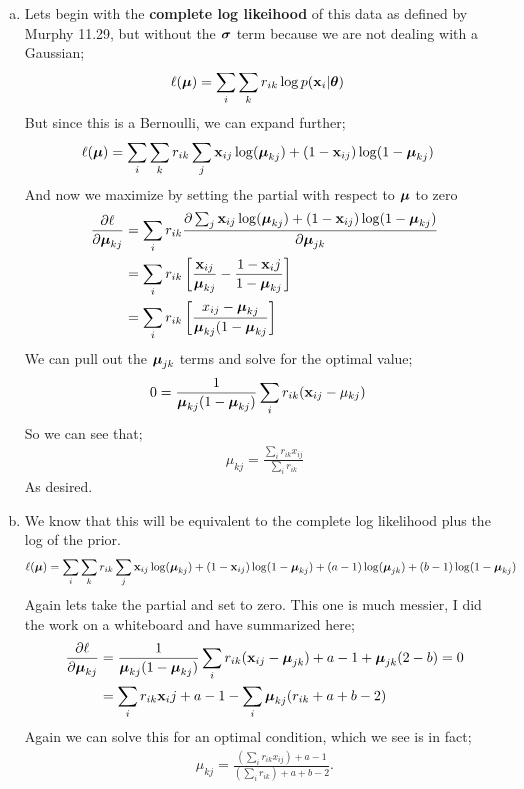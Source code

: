 \documentclass[12pt,letterpaper,fleqn]{hmcpset}
\begin{document}
\begin{solution}
\begin{enumerate}[a.]
    \item 
Lets begin with the \textbf{complete log likeihood} of this data as defined by Murphy 11.29, but without the $\hbox{\boldmath$\sigma$}$ term because we are not dealing with a Gaussian; 
\begin{align*}
    \ell(\hbox{\boldmath$\mu$}) &= \sum_{i}\sum_{k}r_{ik}\log p({\bf x}_i |\hbox{\boldmath$\theta$})
\end{align*}
But since this is a Bernoulli, we can expand further; 
    \begin{align*}
         \ell(\hbox{\boldmath$\mu$})&= \sum_i \sum_k r_{ik} \sum_j {\bf x}_{ij} \log(\hbox{\boldmath$\mu$}_{kj})+(1-{\bf x}_{ij})\log(1-\hbox{\boldmath$\mu$}_{kj})
    \end{align*}
And now we maximize by setting the partial with respect to $\hbox{\boldmath$\mu$}$ to zero
\begin{align*}
    \frac{\partial\ell}{\partial \hbox{\boldmath$\mu$}_{kj}} &= \sum_ir_{ik}\frac{\partial \sum_j {\bf x}_{ij} \log(\hbox{\boldmath$\mu$}_{kj})+(1-{\bf x}_{ij})\log(1-\hbox{\boldmath$\mu$}_{kj})}{\partial \hbox{\boldmath$\mu$}_{jk}}\\
    &= \sum_i r_{ik} \left[ \frac{{\bf x}_{ij}}{\hbox{\boldmath$\mu$}_{kj}}- \frac{1-{\bf x}_ij}{1-\hbox{\boldmath$\mu$}_{kj}}\right]\\
    &= \sum_i r_{ik} \left[ \frac{x_{ij}-\hbox{\boldmath$\mu$}_{kj}}{\hbox{\boldmath$\mu$}_{kj}(1-\hbox{\boldmath$\mu$}_{kj}}\right]
\end{align*}
We can pull out the $\hbox{\boldmath$\mu$}_{jk}$ terms and solve for the optimal value; 
\begin{align*}
    0 &=\frac{1}{\hbox{\boldmath$\mu$}_{kj}(1-\hbox{\boldmath$\mu$}_{kj})} \sum_{i} r_{ik} ({\bf x}_{ij} - \mu_{kj})
\end{align*}
So we can see that;
\begin{align*}
    \mu_{kj} = \frac{\sum_i r_{ik}x_{ij}}{\sum_i r_{ik}}
\end{align*}
As desired. 
\item  We know that this will be equivalent to the  complete log likelihood plus the log of the prior. 
\begin{align*}
    \ell(\hbox{\boldmath$\mu$})&= \sum_i \sum_k r_{ik} \sum_j {\bf x}_{ij} \log(\hbox{\boldmath$\mu$}_{kj})+(1-{\bf x}_{ij})\log(1-\hbox{\boldmath$\mu$}_{kj})+ (a-1) \log(\hbox{\boldmath$\mu$}_{jk})+ (b-1)\log(1-\hbox{\boldmath$\mu$}_{kj})
\end{align*}
Again lets take the partial and set to zero. This one is much messier, I did the work on a whiteboard and have summarized here; 
    \begin{align*}
        \frac{\partial \ell}{\partial \hbox{\boldmath$\mu$}_{kj}}&= \frac{1}{\hbox{\boldmath$\mu$}_{kj}
        (1-\hbox{\boldmath$\mu$}_{kj})}\sum_i r_{ik}({\bf x}_{ij}-\hbox{\boldmath$\mu$}_{jk})+a - 1 + \hbox{\boldmath$\mu$}_{jk}
        (2-b) = 0 \\
        &= \sum_ir_{ik}{\bf x}_ij+a-1-\sum_i \hbox{\boldmath$\mu$}_{kj}(r_{ik}+a+b-2)
    \end{align*}
Again we can solve this for an optimal condition, which we see is in fact; 
\begin{align*}
    \mu_{kj} = \frac{\left(\sum_i r_{ik}x_{ij}\right) + a - 1}{\left(\sum_i r_{ik}\right) + a + b - 2}.
\end{align*}
\end{enumerate}

\end{solution}
\newpage
\end{document}
